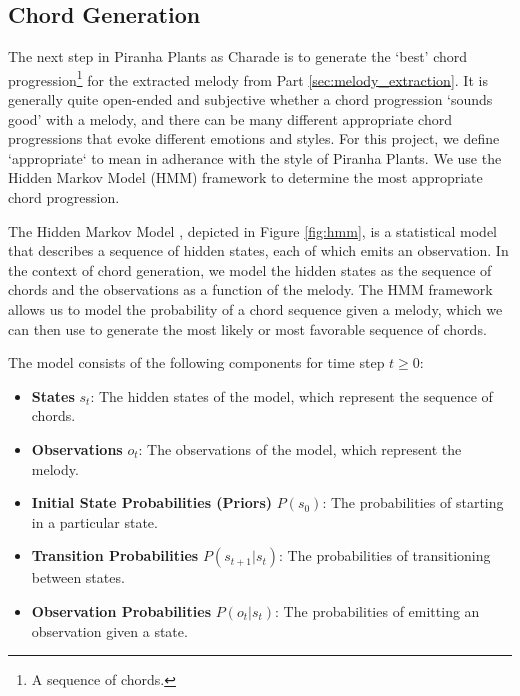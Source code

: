 \subsection{Chord Generation}
\label{sec:chord_generation}

The next step in Piranha Plants as Charade is to generate the `best' chord progression\footnote{A sequence of chords.} for the extracted melody from Part \ref{sec:melody_extraction}. It is generally quite open-ended and subjective whether a chord progression `sounds good' with a melody, and there can be many different appropriate chord progressions that evoke different emotions and styles. For this project, we define `appropriate` to mean in adherance with the style of Piranha Plants. We use the Hidden Markov Model (HMM) framework to determine the most appropriate chord progression.

The Hidden Markov Model \autocite{HMM:2023}, depicted in Figure \ref{fig:hmm}, is a statistical model that describes a sequence of hidden states, each of which emits an observation. In the context of chord generation, we model the hidden states as the sequence of chords and the observations as a function of the melody. The HMM framework allows us to model the probability of a chord sequence given a melody, which we can then use to generate the most likely or most favorable sequence of chords.

The model consists of the following components for time step $t \geq 0$:
\begin{itemize}
    \item \textbf{States} $s_t$: The hidden states of the model, which represent the sequence of chords.
    \item \textbf{Observations} $o_t$: The observations of the model, which represent the melody.
    \item \textbf{Initial State Probabilities (Priors)} $P(s_0)$: The probabilities of starting in a particular state.
    \item \textbf{Transition Probabilities} $P(s_{t+1} | s_t)$: The probabilities of transitioning between states.
    \item \textbf{Observation Probabilities} $P(o_t | s_t)$: The probabilities of emitting an observation given a state.
\end{itemize}

